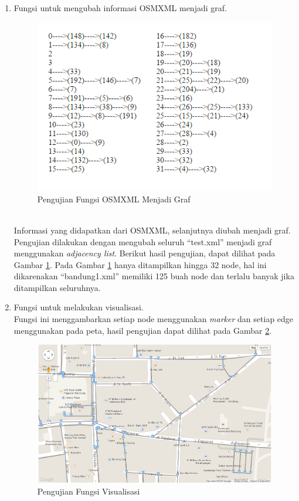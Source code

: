 \begin{enumerate}
\item Fungsi untuk mengubah informasi OSMXML menjadi graf.
\begin{figure}[h]
\centering
\includegraphics[scale=1]{Gambar/pu_graf}
\caption[Pengujian Fungsi OSMXML Menjadi Graf]{Pengujian Fungsi OSMXML Menjadi Graf}
\label{fig:pu_graf}
\end{figure}\\
  Informasi yang didapatkan dari OSMXML, selanjutnya diubah menjadi graf.
  Pengujian dilakukan dengan mengubah seluruh ``test.xml'' menjadi graf
  menggunakan \textit{adjacency list}. Berikut hasil pengujian, dapat dilihat
  pada Gambar \ref{fig:pu_graf}. Pada Gambar \ref{fig:pu_graf} hanya ditampilkan
  hingga 32 node, hal ini dikarenakan ``bandung1.xml'' memiliki 125 buah node
  dan terlalu banyak jika ditampilkan seluruhnya.
  
  \item Fungsi untuk melakukan visualisasi.\\
  Fungsi ini menggambarkan setiap node menggunakan \textit{marker} dan
  setiap edge menggunakan  pada peta, hasil pengujian dapat
  dilihat pada Gambar \ref{fig:pu_visual}.
\begin{figure}[h]
\centering
\includegraphics[scale=0.48]{Gambar/pu_visual}
\caption[Pengujian Fungsi Visualisasi]{Pengujian Fungsi Visualisasi}
\label{fig:pu_visual}
\end{figure}


\end{enumerate}
